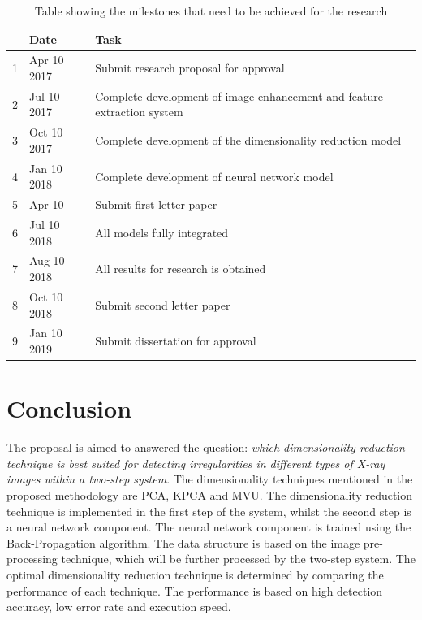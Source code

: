 \documentclass[11pt]{article}
\begin{document}
	\begin{table}[!h]
		\centering
		\caption{Table showing the milestones that need to be achieved for the research}
		\label{tb: milestones}
		\begin{tabular}{| c | l | p{11cm} |}
			\hline 
			& Date & Task \\
			\hline \hline
			1 & Apr 10 2017 & Submit research proposal for approval\\
			\hline
			2 & Jul 10 2017 & Complete development of image enhancement and feature extraction system \\
			\hline
			3 & Oct 10 2017 & Complete development of the dimensionality reduction model \\
			\hline
			4 & Jan 10 2018 & Complete development of neural network model \\
			\hline
			5 & Apr 10 & Submit first letter paper \\
			\hline
			6 & Jul 10 2018 & All models fully integrated \\
			\hline
			7 & Aug 10 2018 & All results for research is obtained \\
			\hline
			8 & Oct 10 2018 & Submit second letter paper \\
			\hline
			9 & Jan 10 2019 & Submit dissertation for approval \\
			\hline
		\end{tabular}
	\end{table}
	
	\newpage
	\section{Conclusion}
	\label{sc: Conclusion}
	The proposal is aimed to answered the question: \textit{which dimensionality reduction technique is best suited for detecting irregularities in different types of X-ray images within a two-step system}. The dimensionality techniques mentioned in the proposed methodology are PCA, KPCA and MVU. The dimensionality reduction technique is implemented in the first step of the system, whilst the second step is a neural network component. The neural network component is trained using the Back-Propagation algorithm. The data structure is based on the image pre-processing technique, which will be further processed by the two-step system. The optimal dimensionality reduction technique is determined by comparing the performance of each technique. The performance is based on high detection accuracy, low error rate and execution speed.
	
	
	
\end{document}
